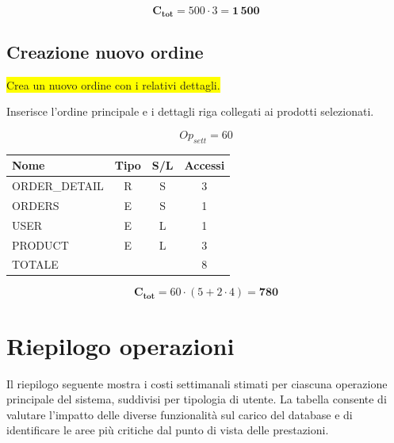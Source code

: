 \documentclass[a4paper,12pt]{report}
\begin{document}
$$\mathbf{C_{tot}} = 500 \cdot 3 = \mathbf{1\,500}$$

\subsection*{Creazione nuovo ordine} \label{op20}
\colorbox{yellow}{Crea un nuovo ordine con i relativi dettagli.}

Inserisce l'ordine principale e i dettagli riga collegati ai prodotti
selezionati.

$$Op_{sett} = 60$$

\begin{table}[H]
  \centering
  \small
  \renewcommand{\arraystretch}{1.15}
  \begin{tabularx}{0.7\textwidth}{|X|c|c|c|}
    \hline
    \rowcolor{gray!20}
    \textbf{Nome} & \textbf{Tipo} & \textbf{S/L} & \textbf{Accessi} \\
    \hline
    ORDER\_DETAIL & R & S & 3 \\
    ORDERS & E & S & 1 \\
    USER & E & L & 1 \\
    PRODUCT & E & L & 3 \\
    \hline
    \rowcolor{gray!20}
    TOTALE & & & 8 \\
    \hline
  \end{tabularx}
  \vspace{-1em}
\end{table}

$$\mathbf{C_{tot}} = 60 \cdot (5 + 2 \cdot 4) = \mathbf{780}$$

\newpage
\section{Riepilogo operazioni}
Il riepilogo seguente mostra i costi settimanali stimati per ciascuna
operazione principale del sistema, suddivisi per tipologia di utente.
La tabella consente di valutare l'impatto delle diverse funzionalità
sul carico del database e di identificare le aree più critiche dal
punto di vista delle prestazioni.
\end{document}
